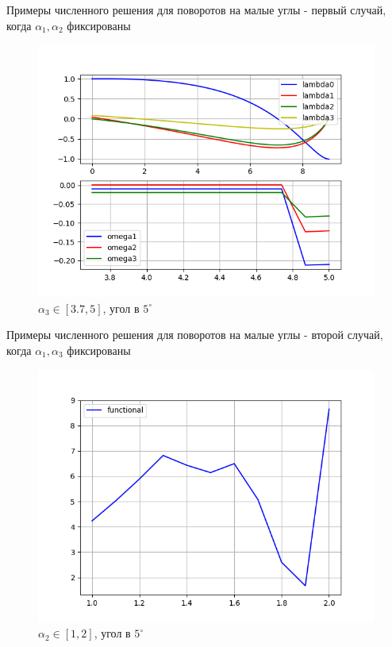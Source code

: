 \documentclass[10pt,utf8,presentation,notheorems,xcolor=dvipsnames,compress]{beamer}
\begin{document}
\begin{frame}{Примеры численного решения для поворотов на малые углы - первый случай, когда $\alpha_1, \alpha_2$ фиксированы}
\begin{figure}[H]
\center\includegraphics[scale=0.5]{fig/ivp_and_control_3_7-5_5.png}
\caption{$\alpha_3 \in [3.7, 5]$, угол в $5^{\circ}$}
\end{figure}
\end{frame}

\begin{frame}{Примеры численного решения для поворотов на малые углы - второй случай, когда $\alpha_1, \alpha_3$ фиксированы}
\begin{figure}[H]
\center\includegraphics[scale=0.5]{fig/functional_alpha2_1-2_5.png}
\caption{$\alpha_2 \in [1, 2]$, угол в $5^{\circ}$}
\end{figure}
\end{frame}
\end{document}
